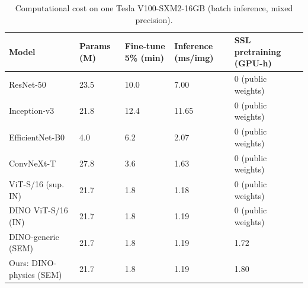 \begin{table}
\caption{Computational cost on one Tesla V100-SXM2-16GB (batch inference, mixed precision).}
\label{tab:t11_efficiency}
\begin{tabular}{lllll}
\toprule
Model & Params (M) & Fine-tune 5\% (min) & Inference (ms/img) & SSL pretraining (GPU-h) \\
\midrule
ResNet-50 & 23.5 & 10.0 & 7.00 & 0 (public weights) \\
Inception-v3 & 21.8 & 12.4 & 11.65 & 0 (public weights) \\
EfficientNet-B0 & 4.0 & 6.2 & 2.07 & 0 (public weights) \\
ConvNeXt-T & 27.8 & 3.6 & 1.63 & 0 (public weights) \\
ViT-S/16 (sup. IN) & 21.7 & 1.8 & 1.18 & 0 (public weights) \\
DINO ViT-S/16 (IN) & 21.7 & 1.8 & 1.19 & 0 (public weights) \\
DINO-generic (SEM) & 21.7 & 1.8 & 1.19 & 1.72 \\
Ours: DINO-physics (SEM) & 21.7 & 1.8 & 1.19 & 1.80 \\
\bottomrule
\end{tabular}
\end{table}
